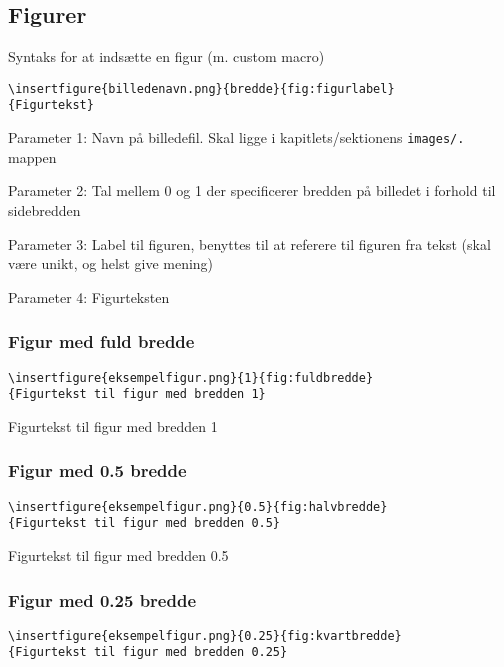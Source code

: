 \subsection{Figurer}
\label{sec:figurer}
Syntaks for at indsætte en figur (m. custom macro)
\begin{verbatim}
\insertfigure{billedenavn.png}{bredde}{fig:figurlabel}
{Figurtekst}
\end{verbatim}

Parameter 1: Navn på billedefil. Skal ligge i kapitlets/sektionens \texttt{images/.} mappen

Parameter 2: Tal mellem 0 og 1 der specificerer bredden på billedet i forhold til sidebredden

Parameter 3: Label til figuren, benyttes til at referere til figuren fra tekst (skal være unikt, og helst give mening)

Parameter 4: Figurteksten 

\subsubsection{Figur med fuld bredde}
\begin{verbatim}
\insertfigure{eksempelfigur.png}{1}{fig:fuldbredde}
{Figurtekst til figur med bredden 1}
\end{verbatim}

{Figurtekst til figur med bredden 1}

\subsubsection{Figur med 0.5 bredde}
\begin{verbatim}
\insertfigure{eksempelfigur.png}{0.5}{fig:halvbredde}
{Figurtekst til figur med bredden 0.5}
\end{verbatim}

{Figurtekst til figur med bredden 0.5}

\subsubsection{Figur med 0.25 bredde}
\begin{verbatim}
\insertfigure{eksempelfigur.png}{0.25}{fig:kvartbredde}
{Figurtekst til figur med bredden 0.25}
\end{verbatim}

